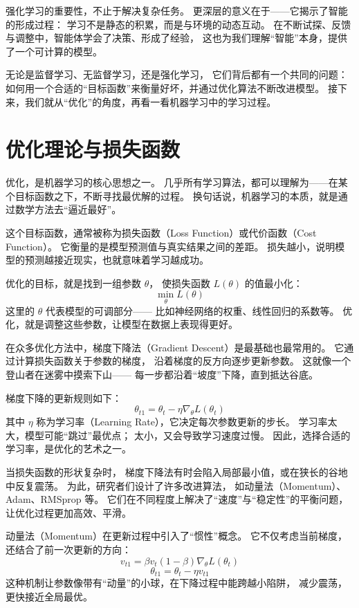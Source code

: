 强化学习的重要性，不止于解决复杂任务。  
更深层的意义在于——它揭示了智能的形成过程：  
学习不是静态的积累，而是与环境的动态互动。  
在不断试探、反馈与调整中，智能体学会了决策、形成了经验，  
这也为我们理解“智能”本身，提供了一个可计算的模型。

无论是监督学习、无监督学习，还是强化学习，  
它们背后都有一个共同的问题：  
如何用一个合适的“目标函数”来衡量好坏，并通过优化算法不断改进模型。  
接下来，我们就从“优化”的角度，再看一看机器学习中的学习过程。

\section{优化理论与损失函数}

优化，是机器学习的核心思想之一。  
几乎所有学习算法，都可以理解为——在某个目标函数之下，不断寻找最优解的过程。  
换句话说，机器学习的本质，就是通过数学方法去“逼近最好”。

这个目标函数，通常被称为损失函数（Loss Function）或代价函数（Cost Function）。  
它衡量的是模型预测值与真实结果之间的差距。  
损失越小，说明模型的预测越接近现实，也就意味着学习越成功。

优化的目标，就是找到一组参数 $\theta$，  
使损失函数 $L(\theta)$ 的值最小化：
$$
\min_{\theta} L(\theta)
$$  
这里的 $\theta$ 代表模型的可调部分——  
比如神经网络的权重、线性回归的系数等。  
优化，就是调整这些参数，让模型在数据上表现得更好。

在众多优化方法中，梯度下降法（Gradient Descent）是最基础也最常用的。  
它通过计算损失函数关于参数的梯度，  
沿着梯度的反方向逐步更新参数。  
这就像一个登山者在迷雾中摸索下山——  
每一步都沿着“坡度”下降，直到抵达谷底。

梯度下降的更新规则如下：
$$
\theta_{t1} = \theta_t - \eta \nabla_\theta L(\theta_t)
$$  
其中 $\eta$ 称为学习率（Learning Rate），它决定每次参数更新的步长。  
学习率太大，模型可能“跳过”最优点；  
太小，又会导致学习速度过慢。  
因此，选择合适的学习率，是优化的艺术之一。

当损失函数的形状复杂时，  
梯度下降法有时会陷入局部最小值，或在狭长的谷地中反复震荡。  
为此，研究者们设计了许多改进算法，  
如动量法（Momentum）、Adam、RMSprop 等。  
它们在不同程度上解决了“速度”与“稳定性”的平衡问题，  
让优化过程更加高效、平滑。

动量法（Momentum）在更新过程中引入了“惯性”概念。  
它不仅考虑当前梯度，还结合了前一次更新的方向：  
$$
v_{t1} = \beta v_t  (1 - \beta) \nabla_\theta L(\theta_t)
$$  
$$
\theta_{t1} = \theta_t - \eta v_{t1}
$$  
这种机制让参数像带有“动量”的小球，在下降过程中能跨越小陷阱，  
减少震荡，更快接近全局最优。

